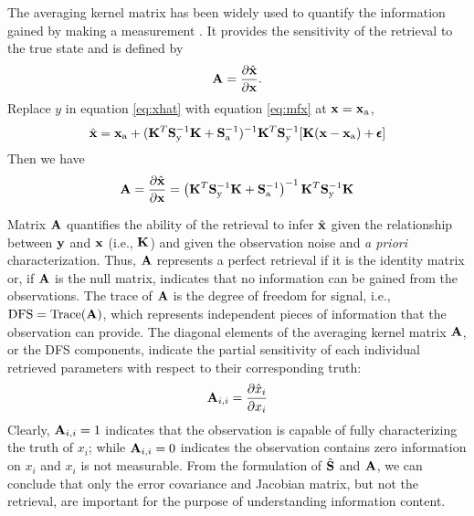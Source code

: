 The averaging kernel matrix has been widely used to quantify the
information gained by making a measurement \citep[e.g.,][]{Rodgers98,
Hasekamp05a, Frankenberg12, Sanghavi12}. It provides the sensitivity of 
the retrieval to the true state and is defined by 
\begin{equation}
\mathbf{A}=\frac{\partial{\hat{\mathbf{x}}}}{\partial\mathbf{x}}. 
\end{equation}
Replace $y$ in equation \eqref{eq:xhat} with equation \eqref{eq:mfx}
at $\mathbf{x}=\mathbf{x}_\text{a}$, 
\begin{equation}
\hat{\mathbf{x}} = \mathbf{x}_\text{a} + (\mathbf{K}^T\mathbf{S}_\text{y}^{-1}\mathbf{K}+\mathbf{S}_\text{a}^{-1})^{-1}
\mathbf{K}^T\mathbf{S}_\text{y}^{-1}[\mathbf{K}(\mathbf{x}-\mathbf{x}_\text{a})+\pmb{\epsilon}] 
\end{equation}
Then we have
\begin{equation}
\mathbf{A}=\frac{\partial{\hat{\mathbf{x}}}}{\partial\mathbf{x}}
    =\left(\mathbf{K}^T\mathbf{S}_\text{y}^{-1}\mathbf{K}+\mathbf{S}_\text{a}^{-1}\right)^{-1}
     \mathbf{K}^T\mathbf{S}_\text{y}^{-1}\mathbf{K}
\end{equation}

Matrix $\mathbf{A}$ quantifies the ability of the retrieval to infer
$\hat{\mathbf{x}}$ given the relationship between $\mathbf{y}$ and $\mathbf{x}$ (i.e.,
$\mathbf{K}$) and given the observation noise and \textit{a priori} characterization. 
Thus, $\mathbf{A}$ represents a perfect retrieval if it is the identity matrix or,
if $\mathbf{A}$ is the null matrix, indicates that no information can be gained
from the observations. The trace of $\mathbf{A}$ is the
degree of freedom for signal, i.e., $\text{DFS}=\text{Trace}(\mathbf{A})$, 
which represents independent pieces of information that the observation 
can provide. The diagonal elements of the averaging kernel matrix $\mathbf{A}$, 
or the DFS components, indicate the partial sensitivity of each 
individual retrieved parameters with respect to their corresponding truth: 
\begin{equation}
\mathbf{A}_{i,i}=\frac{\partial\hat{x}_i}{\partial x_i}
\end{equation}
Clearly, $\mathbf{A}_{i,i}=1$ indicates that the observation is capable
of fully characterizing the truth of $x_i$; while $\mathbf{A}_{i,i}=0$ 
indicates the observation contains zero information on $x_i$ and $x_i$ 
is not measurable. From the formulation of $\hat{\mathbf{S}}$ and $\mathbf{A}$, 
we can conclude that only the error covariance and Jacobian matrix, 
but not the retrieval, are important for the purpose of understanding 
information content.

